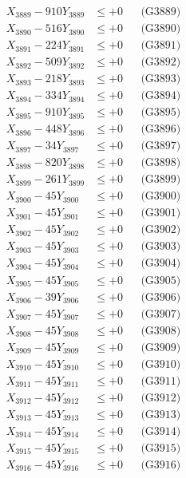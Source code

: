 \documentclass[a4paper,10pt]{article}
\begin{document}
{\begin{align}
X_{3889} - 910Y_{3889} &\leq +0 && \text{(G3889)} \\
X_{3890} - 516Y_{3890} &\leq +0 && \text{(G3890)} \\
\allowbreak
X_{3891} - 224Y_{3891} &\leq +0 && \text{(G3891)} \\
X_{3892} - 509Y_{3892} &\leq +0 && \text{(G3892)} \\
X_{3893} - 218Y_{3893} &\leq +0 && \text{(G3893)} \\
X_{3894} - 334Y_{3894} &\leq +0 && \text{(G3894)} \\
X_{3895} - 910Y_{3895} &\leq +0 && \text{(G3895)} \\
X_{3896} - 448Y_{3896} &\leq +0 && \text{(G3896)} \\
X_{3897} - 34Y_{3897} &\leq +0 && \text{(G3897)} \\
X_{3898} - 820Y_{3898} &\leq +0 && \text{(G3898)} \\
X_{3899} - 261Y_{3899} &\leq +0 && \text{(G3899)} \\
X_{3900} - 45Y_{3900} &\leq +0 && \text{(G3900)} \\
\allowbreak
X_{3901} - 45Y_{3901} &\leq +0 && \text{(G3901)} \\
X_{3902} - 45Y_{3902} &\leq +0 && \text{(G3902)} \\
X_{3903} - 45Y_{3903} &\leq +0 && \text{(G3903)} \\
X_{3904} - 45Y_{3904} &\leq +0 && \text{(G3904)} \\
X_{3905} - 45Y_{3905} &\leq +0 && \text{(G3905)} \\
X_{3906} - 39Y_{3906} &\leq +0 && \text{(G3906)} \\
X_{3907} - 45Y_{3907} &\leq +0 && \text{(G3907)} \\
X_{3908} - 45Y_{3908} &\leq +0 && \text{(G3908)} \\
X_{3909} - 45Y_{3909} &\leq +0 && \text{(G3909)} \\
X_{3910} - 45Y_{3910} &\leq +0 && \text{(G3910)} \\
\allowbreak
X_{3911} - 45Y_{3911} &\leq +0 && \text{(G3911)} \\
X_{3912} - 45Y_{3912} &\leq +0 && \text{(G3912)} \\
X_{3913} - 45Y_{3913} &\leq +0 && \text{(G3913)} \\
X_{3914} - 45Y_{3914} &\leq +0 && \text{(G3914)} \\
X_{3915} - 45Y_{3915} &\leq +0 && \text{(G3915)} \\
X_{3916} - 45Y_{3916} &\leq +0 && \text{(G3916)} \\

\end{align}}
\end{document}
